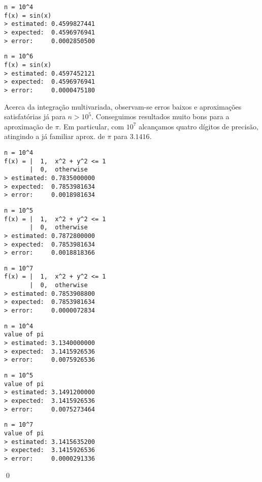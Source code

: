 \documentclass[11pt,reqno,a4paper]{amsart}
\begin{document}
\begin{verbatim}
n = 10^4
f(x) = sin(x)
> estimated: 0.4599827441
> expected:  0.4596976941
> error:     0.0002850500
\end{verbatim}

\begin{verbatim}
n = 10^6
f(x) = sin(x)
> estimated: 0.4597452121
> expected:  0.4596976941
> error:     0.0000475180
\end{verbatim}

\bigskip
Acerca da integração multivariada, observam-se erros baixos e aproximações satisfatórias já para $n > 10^5$. Conseguimos resultados muito bons para a aproximação de $\pi$. Em particular, com $10^7$ alcançamos quatro dígitos de precisão, atingindo a já familiar aprox. de $\pi$ para $3.1416$.

\begin{verbatim}
n = 10^4
f(x) = |  1,  x^2 + y^2 <= 1
       |  0,  otherwise
> estimated: 0.7835000000
> expected:  0.7853981634
> error:     0.0018981634
\end{verbatim}

\begin{verbatim}
n = 10^5
f(x) = |  1,  x^2 + y^2 <= 1
       |  0,  otherwise
> estimated: 0.7872800000
> expected:  0.7853981634
> error:     0.0018818366
\end{verbatim}

\begin{verbatim}
n = 10^7
f(x) = |  1,  x^2 + y^2 <= 1
       |  0,  otherwise
> estimated: 0.7853908800
> expected:  0.7853981634
> error:     0.0000072834
\end{verbatim}

\begin{verbatim}
n = 10^4
value of pi
> estimated: 3.1340000000
> expected:  3.1415926536
> error:     0.0075926536
\end{verbatim}

\begin{verbatim}
n = 10^5
value of pi
> estimated: 3.1491200000
> expected:  3.1415926536
> error:     0.0075273464
\end{verbatim}

\begin{verbatim}
n = 10^7
value of pi
> estimated: 3.1415635200
> expected:  3.1415926536
> error:     0.0000291336
\end{verbatim}
\qed\null

\endgroup
\end{document}
